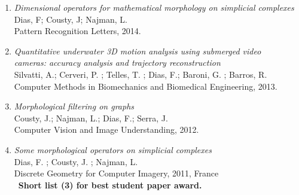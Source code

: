 \documentclass[]{friggeri-cv}
\newcommand{\pub}[3]{
  {\emph{#1}\\
    #2\\
    #3}}
\begin{document}
\begin{enumerate}
\item{
  \pub
      {Dimensional operators for mathematical morphology on simplicial complexes}
      {Dias, F; Cousty, J; Najman, L.}
      {Pattern  Recognition Letters, 2014.}
}

\item{
  \pub
    {Quantitative underwater 3D motion analysis using submerged video\\
      cameras: accuracy analysis and trajectory reconstruction}
    {Silvatti, A.; Cerveri, P. ; Telles, T. ; Dias, F.; Baroni, G. ; Barros, R.}
    {Computer Methods in Biomechanics and Biomedical Engineering, 2013.}
}
  
\item{
  \pub
      {Morphological filtering on graphs}
      {Cousty, J.; Najman, L.; Dias, F.; Serra, J.}
      {Computer Vision and Image Understanding, 2012.}
}
\item{
  \pub
      {Some morphological operators on simplicial complexes}
      {Dias, F. ; Cousty, J. ; Najman, L.}
      {Discrete Geometry for Computer Imagery, 2011, France}
      \\~\textbf{Short list (3) for best student paper award.}
}
\end{enumerate}
\end{document}
